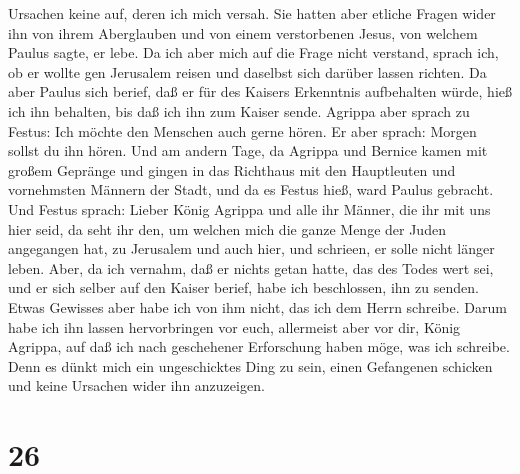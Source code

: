 Ursachen keine auf, deren ich mich versah.  Sie hatten aber
etliche Fragen wider ihn von ihrem Aberglauben und von einem
verstorbenen Jesus, von welchem Paulus sagte, er lebe.  Da
ich aber mich auf die Frage nicht verstand, sprach ich, ob er wollte gen
Jerusalem reisen und daselbst sich darüber lassen richten. 
Da aber Paulus sich berief, daß er für des Kaisers Erkenntnis
aufbehalten würde, hieß ich ihn behalten, bis daß ich ihn zum Kaiser
sende.  Agrippa aber sprach zu Festus: Ich möchte den
Menschen auch gerne hören. Er aber sprach: Morgen sollst du ihn hören.
 Und am andern Tage, da Agrippa und Bernice kamen mit
großem Gepränge und gingen in das Richthaus mit den Hauptleuten und
vornehmsten Männern der Stadt, und da es Festus hieß, ward Paulus
gebracht.  Und Festus sprach: Lieber König Agrippa und alle
ihr Männer, die ihr mit uns hier seid, da seht ihr den, um welchen mich
die ganze Menge der Juden angegangen hat, zu Jerusalem und auch hier,
und schrieen, er solle nicht länger leben.  Aber, da ich
vernahm, daß er nichts getan hatte, das des Todes wert sei, und er sich
selber auf den Kaiser berief, habe ich beschlossen, ihn zu senden.
 Etwas Gewisses aber habe ich von ihm nicht, das ich dem
Herrn schreibe. Darum habe ich ihn lassen hervorbringen vor euch,
allermeist aber vor dir, König Agrippa, auf daß ich nach geschehener
Erforschung haben möge, was ich schreibe.  Denn es dünkt
mich ein ungeschicktes Ding zu sein, einen Gefangenen schicken und keine
Ursachen wider ihn anzuzeigen.

\hypertarget{section-25}{%
\section{26}\label{section-25}}

